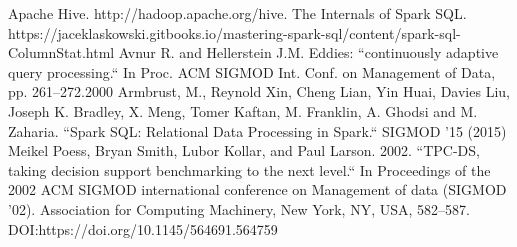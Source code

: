 \documentclass[conference]{IEEEtran}
\begin{document}
\begin{thebibliography}{00}
 Apache Hive. http://hadoop.apache.org/hive.
 The Internals of Spark SQL. https://jaceklaskowski.gitbooks.io/mastering-spark-sql/content/spark-sql-ColumnStat.html
 Avnur R. and Hellerstein J.M. Eddies: ``continuously adaptive query processing.`` In Proc. ACM SIGMOD Int. Conf. on Management of Data, pp. 261–272.2000
 Armbrust, M., Reynold Xin, Cheng Lian, Yin Huai, Davies Liu, Joseph K. Bradley, X. Meng, Tomer Kaftan, M. Franklin, A. Ghodsi and M. Zaharia. ``Spark SQL: Relational Data Processing in Spark.`` SIGMOD '15 (2015)
 Meikel Poess, Bryan Smith, Lubor Kollar, and Paul Larson. 2002. ``TPC-DS, taking decision support benchmarking to the next level.``  In Proceedings of the 2002 ACM SIGMOD international conference on Management of data (SIGMOD '02). Association for Computing Machinery, New York, NY, USA, 582–587. DOI:https://doi.org/10.1145/564691.564759
\end{thebibliography}
\end{document}
